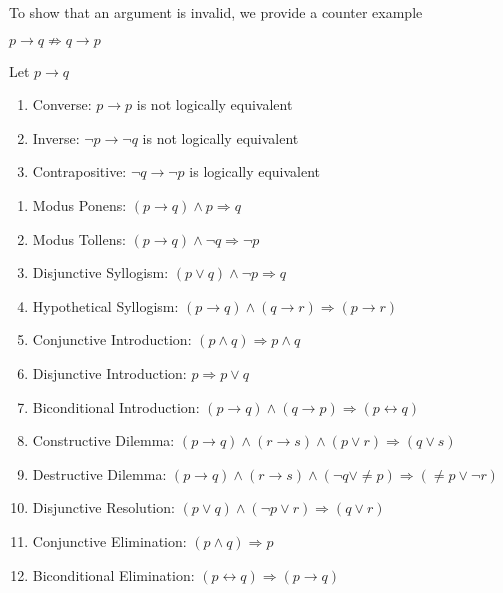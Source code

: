 \documentclass{article}
\begin{document}
\begin{remark}
    To show that an argument is invalid, we provide a counter example
\end{remark}

\begin{proposition}
    $ p \to q \not\Longrightarrow q \to p$
\end{proposition}

\begin{remark}
    Let $p \to q$
    \begin{enumerate}
	\item Converse: $ p \to p$ is not logically equivalent
	\item Inverse: $ \neg p \to \neg q$ is not logically equivalent
	\item Contrapositive: $ \neg q \to \neg p$ is logically equivalent
    \end{enumerate}
\end{remark}

\begin{proposition}
    \begin{enumerate}
	\item Modus Ponens: $ (p \to q) \land p \Longrightarrow q$
	\item Modus Tollens: $ (p \to q) \land \neg q \Longrightarrow
	    \neg p$
	\item Disjunctive Syllogism: $ (p \lor q) \land \neg p
	    \Longrightarrow q$
	\item Hypothetical Syllogism: $ (p \to q) \land (q \to r)
	    \Longrightarrow (p \to r)$
	\item Conjunctive Introduction: $(p \land q) \Longrightarrow
	    p \land q$
	\item Disjunctive Introduction: $ p \Longrightarrow p \lor q$
	\item Biconditional Introduction: $ (p \to q) \land (q \to p)
	    \Longrightarrow (p \leftrightarrow q)$
	\item Constructive Dilemma: $(p \to q) \land (r \to s)
	    \land (p \lor r) \Longrightarrow (q \lor s)$
	\item Destructive Dilemma: $(p \to q) \land (r \to s)
	    \land (\neg q \lor \neq p) \Longrightarrow
	    (\neq p \lor \neg r)$
	\item Disjunctive Resolution: $(p \lor q) \land (\neg p \lor r)
	    \Longrightarrow (q \lor r)$
	\item Conjunctive Elimination: $ (p \land q) \Longrightarrow p$
	\item Biconditional Elimination: $ (p \leftrightarrow q)
	    \Longrightarrow (p \to q)$
    \end{enumerate}
\end{proposition}
\end{document}
